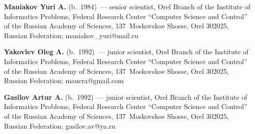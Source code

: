   \vspace*{3pt}
  
  \noindent
  \textbf{Maniakov Yuri A.} (b.\ 1984)~--- senior scientist, Orel Branch of the 
Institute of Informatics Problems, Federal Research Center ``Computer Science and 
Control'' of the Russian Academy of Sciences, 137~Moskovskoe Shosse, Orel 
302025, Russian Federation; \mbox{maniakov\_yuri@mail.ru}
  
  \vspace*{3pt}
  
  \noindent
  \textbf{Yakovlev Oleg A.} (b.\ 1992)~--- junior scientist, Orel Branch of the 
Institute of Informatics Problems, Federal Research Center ``Computer Science and 
Control'' of the Russian Academy of Sciences, 137~Moskovskoe Shosse, Orel 
302025, Russian Federation; \mbox{maucra@gmail.com}
  
  \vspace*{3pt}
  
  \noindent
  \textbf{Gasilov Artur A.} (b.\ 1992)~--- junior scientist, Orel Branch of the 
Institute of Informatics Problems, Federal Research Center ``Computer Science and 
Control'' of the Russian Academy of Sciences, 137~Moskovskoe Shosse, Orel 
302025, Russian Federation; \mbox{gasilov.av@ya.ru}
\label{end\stat}


\renewcommand{\bibname}{\protect\rm Литература} 
  